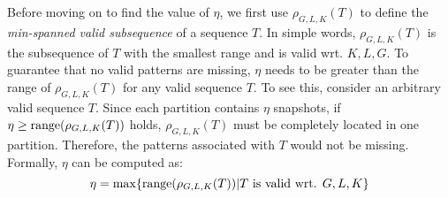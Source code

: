 Before moving on to find the value of $\eta$, 
we first use $\rho_{G,L,K}(T)$ to define the \emph{min-spanned valid subsequence} 
of a sequence $T$. In simple words, $\rho_{G,L,K}(T)$ is the 
subsequence of $T$ with the smallest range and is valid wrt. $K,L,G$. 
To guarantee that no valid patterns are missing, $\eta$ needs
to be greater than the range of $\rho_{G,L,K}(T)$ for any
valid sequence $T$. To see this, consider an arbitrary valid sequence $T$.
Since each partition contains $\eta$ snapshots,
if $\eta \geq \operatorname*{range}(\rho_{G,L,K}(T))$ holds, $\rho_{G,L,K}(T)$ must be completely located in one partition. Therefore, the patterns associated with $T$ would not be missing.
Formally, $\eta$ can be computed as:
\begin{equation}
\eta = \max\{\operatorname*{range}(\rho_{G,L,K}(T)) | T \text{ is valid wrt. } G,L,K\}
\end{equation}

